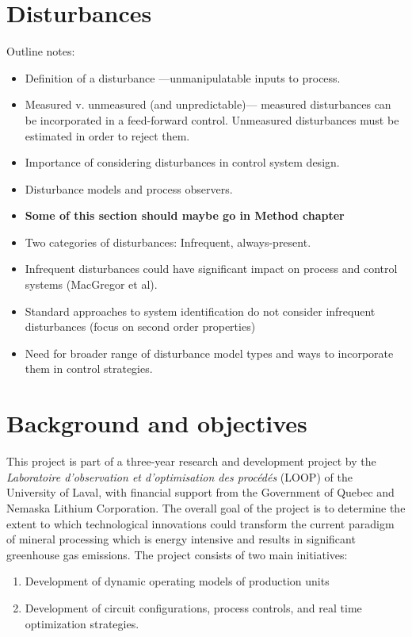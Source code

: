 \section*{Disturbances}

Outline notes:

\begin{itemize}
	\item Definition of a disturbance —unmanipulatable inputs to process.
	\item Measured v. unmeasured (and unpredictable)— measured disturbances can be incorporated in a feed-forward control.  Unmeasured disturbances must be estimated in order to reject them.
	\item Importance of considering disturbances in control system design.
	\item Disturbance models and process observers.
	\item \textbf{Some of this section should maybe go in Method chapter}
	\item Two categories of disturbances: Infrequent, always-present.
	\item Infrequent disturbances could have significant impact on process and control systems (MacGregor et al).
	\item Standard approaches to system identification do not consider infrequent disturbances (focus on second order properties)
	\item Need for broader range of disturbance model types and ways to incorporate them in control strategies.
\end{itemize}

\section*{Background and objectives}

This project is part of a three-year research and development project by the \textit{Laboratoire d’observation et d’optimisation des procédés} (LOOP) of the University of Laval, with financial support from the Government of Quebec and Nemaska Lithium Corporation. The overall goal of the project is to determine the extent to which technological innovations could transform the current paradigm of mineral processing which is energy intensive and results in significant greenhouse gas emissions. The project consists of two main initiatives:

\begin{enumerate}
	\item Development of dynamic operating models of production units
	\item Development of circuit configurations, process controls, and real time optimization strategies.
\end{enumerate}


